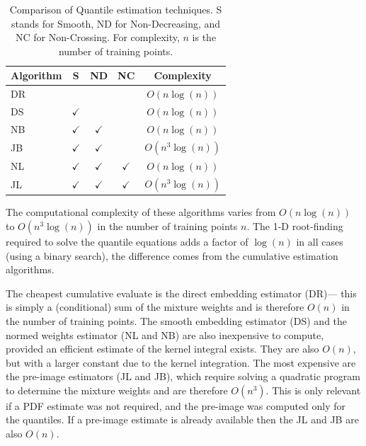 \documentclass[twoside]{article} \usepackage{aistats2017}
\theoremstyle{definition}
\theoremstyle{remark}
\begin{document}
	\begin{table}[t!]
		\begin{center}
			\begin{tabular}{l|cccc}
				Algorithm & S & ND &   NC & Complexity \\ \hline
				DR  &              &                &                & $O(n \log(n))$    \\
				DS  & $\checkmark$ &                &                &
				$O(n \log(n))$  \\
				NB  & $\checkmark$ & $\checkmark$   &                &
				$O(n \log(n))$ \\
				JB  & $\checkmark$ & $\checkmark$   &                &
				$O(n^{3} \log(n))$ \\
				NL  & $\checkmark$ & $\checkmark$   & $\checkmark$   &
				$O(n \log(n))$ \\
				JL  & $\checkmark$ & $\checkmark$   & $\checkmark$   &   $O(n^{3} \log(n))$ 
			\end{tabular}
		\end{center}
		\caption{Comparison of Quantile estimation techniques. S stands for Smooth, ND for Non-Decreasing, and NC for Non-Crossing. For complexity, $n$ is the number of training points.}
		\label{table:quantile_regression_methods}
	\end{table}
	
		
	The computational complexity of these algorithms varies from $O(n \log(n))$ to $O(n^{3} \log(n))$ in the number of training points $n$. The 1-D root-finding required to solve the quantile equations adds a factor of $\log(n)$ in all cases (using a binary search), the difference comes from the cumulative estimation algorithms.
	
	The cheapest cumulative evaluate is the direct embedding estimator (DR)--- this is simply a (conditional) sum of the mixture weights and is therefore $O(n)$ in the number of training points. The smooth embedding estimator (DS) and the normed weights estimator (NL and NB) are also inexpensive to compute, provided an efficient estimate of the kernel integral exists. They are also $O(n)$, but with a larger constant due to the kernel integration. The most expensive are the pre-image estimators (JL and JB), which require solving a quadratic program to determine the mixture weights and are therefore $O(n^3)$. This is only relevant if a PDF estimate was not required, and the pre-image was computed only for the quantiles. If a pre-image estimate is already available then the JL and JB are also $O(n)$.
	
\end{document}
